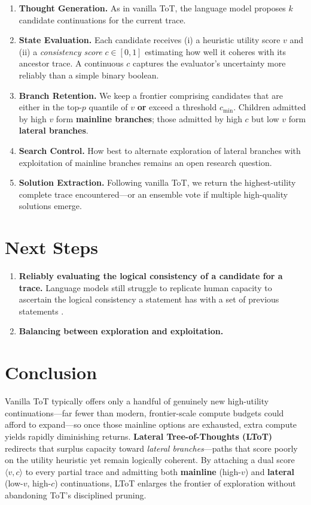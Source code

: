 \documentclass{IEEEtran}
\begin{document}
\begin{enumerate}
   \item
      \textbf{Thought Generation.}
      As in vanilla ToT, the language model proposes $k$ candidate continuations for the current trace.
   \item
      \textbf{State Evaluation.}
      Each candidate receives (i) a heuristic utility score $v$ and (ii) a \textit{consistency score} $c \in [0, 1]$ estimating how well it coheres with its ancestor trace.
      A continuous $c$ captures the evaluator's uncertainty more reliably than a simple binary boolean.
   \item
      \textbf{Branch Retention.}
      We keep a frontier comprising candidates that are either in the top-$p$ quantile of $v$ \textbf{or} exceed a threshold $c_{\text{min}}$.
      Children admitted by high $v$ form \textbf{mainline branches}; those admitted by high $c$ but low $v$ form \textbf{lateral branches}.
   \item
      \textbf{Search Control.}
      How best to alternate exploration of lateral branches with exploitation of mainline branches remains an open research question.
   \item
      \textbf{Solution Extraction.}
      Following vanilla ToT, we return the highest-utility complete trace encountered---or an ensemble vote if multiple high-quality solutions emerge.
\end{enumerate}


\section{Next Steps}
\label{section:next-steps}


\begin{enumerate}
   \item
      \textbf{Reliably evaluating the logical consistency of a candidate for a trace.}
      Language models still struggle to replicate human capacity to ascertain the logical consistency a statement has with a set of previous statements \cite{ghosh2025logical}.
   \item
      \textbf{Balancing between exploration and exploitation.}
\end{enumerate}


\section{Conclusion}
\label{section:conclusion}

Vanilla ToT typically offers only a handful of genuinely new high-utility continuations---far fewer than modern, frontier-scale compute budgets could afford to expand---so once those mainline options are exhausted, extra compute yields rapidly diminishing returns.
\textbf{Lateral Tree-of-Thoughts (LToT)} redirects that surplus capacity toward \textit{lateral branches}---paths that score poorly on the utility heuristic yet remain logically coherent.
By attaching a dual score $\langle v, c\rangle$ to every partial trace and admitting both \textbf{mainline} (high-$v$) and \textbf{lateral} (low-$v$, high-$c$) continuations, LToT enlarges the frontier of exploration without abandoning ToT's disciplined pruning.
\end{document}
